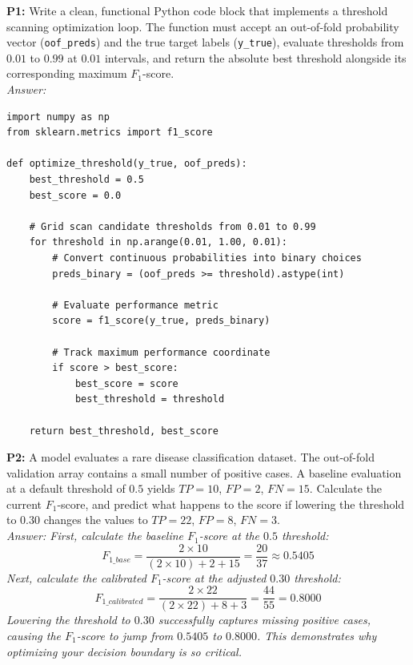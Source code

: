 \documentclass{article}
\begin{document}
\textbf{P1:} Write a clean, functional Python code block that implements a threshold scanning optimization loop. The function must accept an out-of-fold probability vector (\texttt{oof\_preds}) and the true target labels (\texttt{y\_true}), evaluate thresholds from $0.01$ to $0.99$ at $0.01$ intervals, and return the absolute best threshold alongside its corresponding maximum $F_1$-score.
\\
\textit{Answer:}
\begin{verbatim}
import numpy as np
from sklearn.metrics import f1_score

def optimize_threshold(y_true, oof_preds):
    best_threshold = 0.5
    best_score = 0.0

    # Grid scan candidate thresholds from 0.01 to 0.99
    for threshold in np.arange(0.01, 1.00, 0.01):
        # Convert continuous probabilities into binary choices
        preds_binary = (oof_preds >= threshold).astype(int)

        # Evaluate performance metric
        score = f1_score(y_true, preds_binary)

        # Track maximum performance coordinate
        if score > best_score:
            best_score = score
            best_threshold = threshold

    return best_threshold, best_score
\end{verbatim}

\newline
\textbf{P2:} A model evaluates a rare disease classification dataset. The out-of-fold validation array contains a small number of positive cases. A baseline evaluation at a default threshold of $0.5$ yields $TP=10$, $FP=2$, $FN=15$. Calculate the current $F_1$-score, and predict what happens to the score if lowering the threshold to $0.30$ changes the values to $TP=22$, $FP=8$, $FN=3$.
\\
\textit{Answer: First, calculate the baseline $F_1$-score at the $0.5$ threshold:
\begin{equation*}
    F_{1\_base} = \frac{2 \times 10}{(2 \times 10) + 2 + 15} = \frac{20}{37} \approx 0.5405
\end{equation*}
Next, calculate the calibrated $F_1$-score at the adjusted $0.30$ threshold:
\begin{equation*}
    F_{1\_calibrated} = \frac{2 \times 22}{(2 \times 22) + 8 + 3} = \frac{44}{55} = 0.8000
\end{equation*}
Lowering the threshold to $0.30$ successfully captures missing positive cases, causing the $F_1$-score to jump from $0.5405$ to $0.8000$. This demonstrates why optimizing your decision boundary is so critical.}
\end{document}
